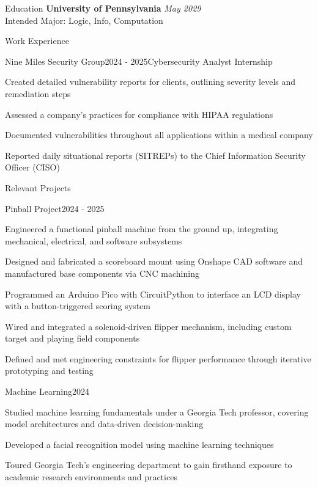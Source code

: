 \documentclass{resume}
\begin{document}
  \begin{rSection}{Education}
    {\bf University of Pennsylvania} \hfill {\em May 2029} \\ 
    { Intended Major: Logic, Info, Computation } \\
  \end{rSection}
  
  \begin{rSection}{Work Experience}
  
    \begin{rSubsection}{Nine Miles Security Group}{2024 - 2025}{Cybersecurity Analyst Internship}{}
    \item Created detailed vulnerability reports for clients, outlining severity levels and remediation steps
    \item Assessed a company's practices for compliance with HIPAA regulations
    \item Documented vulnerabilities throughout all applications within a medical company
    \item Reported daily situational reports (SITREPs) to the Chief Information Security Officer (CISO)
    \end{rSubsection}
  
  \end{rSection}

  \begin{rSection}{Relevant Projects}
  
    \begin{rSubsection}{Pinball Project}{2024 - 2025}{}{}
    \item Engineered a functional pinball machine from the ground up, integrating mechanical, electrical, and software subsystems
    \item Designed and fabricated a scoreboard mount using Onshape CAD software and manufactured base components via CNC machining
    \item Programmed an Arduino Pico with CircuitPython to interface an LCD display with a button-triggered scoring system
    \item Wired and integrated a solenoid-driven flipper mechanism, including custom target and playing field components
    \item Defined and met engineering constraints for flipper performance through iterative prototyping and testing
    \end{rSubsection}
    
    \begin{rSubsection}{Machine Learning}{2024}{}{}
    \item Studied machine learning fundamentals under a Georgia Tech professor, covering model architectures and data-driven decision-making
    \item Developed a facial recognition model using machine learning techniques
    \item Toured Georgia Tech's engineering department to gain firsthand exposure to academic research environments and practices
    \end{rSubsection}
  \end{rSection}
  
\end{document}
